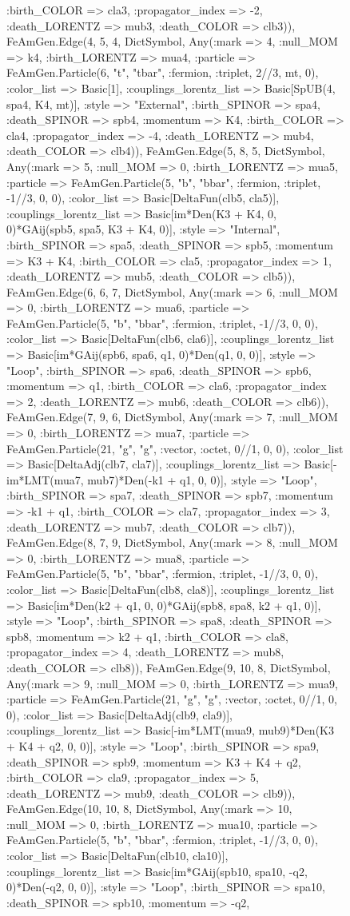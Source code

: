 \documentclass{revtex4}
\begin{document}
\begin{figure}[!htb]
\begin{center}
{:birth_COLOR => cla3, :propagator_index => -2, :death_LORENTZ => mub3, :death_COLOR => clb3)), FeAmGen.Edge(4, 5, 4, Dict{Symbol, Any}(:mark => 4, :null_MOM => k4, :birth_LORENTZ => mua4, :particle => FeAmGen.Particle(6, "t", "tbar", :fermion, :triplet, 2//3, mt, 0), :color_list => Basic[1], :couplings_lorentz_list => Basic[SpUB(4, spa4, K4, mt)], :style => "External", :birth_SPINOR => spa4, :death_SPINOR => spb4, :momentum => K4, :birth_COLOR => cla4, :propagator_index => -4, :death_LORENTZ => mub4, :death_COLOR => clb4)), FeAmGen.Edge(5, 8, 5, Dict{Symbol, Any}(:mark => 5, :null_MOM => 0, :birth_LORENTZ => mua5, :particle => FeAmGen.Particle(5, "b", "bbar", :fermion, :triplet, -1//3, 0, 0), :color_list => Basic[DeltaFun(clb5, cla5)], :couplings_lorentz_list => Basic[im*Den(K3 + K4, 0, 0)*GAij(spb5, spa5, K3 + K4, 0)], :style => "Internal", :birth_SPINOR => spa5, :death_SPINOR => spb5, :momentum => K3 + K4, :birth_COLOR => cla5, :propagator_index => 1, :death_LORENTZ => mub5, :death_COLOR => clb5)), FeAmGen.Edge(6, 6, 7, Dict{Symbol, Any}(:mark => 6, :null_MOM => 0, :birth_LORENTZ => mua6, :particle => FeAmGen.Particle(5, "b", "bbar", :fermion, :triplet, -1//3, 0, 0), :color_list => Basic[DeltaFun(clb6, cla6)], :couplings_lorentz_list => Basic[im*GAij(spb6, spa6, q1, 0)*Den(q1, 0, 0)], :style => "Loop", :birth_SPINOR => spa6, :death_SPINOR => spb6, :momentum => q1, :birth_COLOR => cla6, :propagator_index => 2, :death_LORENTZ => mub6, :death_COLOR => clb6)), FeAmGen.Edge(7, 9, 6, Dict{Symbol, Any}(:mark => 7, :null_MOM => 0, :birth_LORENTZ => mua7, :particle => FeAmGen.Particle(21, "g", "g", :vector, :octet, 0//1, 0, 0), :color_list => Basic[DeltaAdj(clb7, cla7)], :couplings_lorentz_list => Basic[-im*LMT(mua7, mub7)*Den(-k1 + q1, 0, 0)], :style => "Loop", :birth_SPINOR => spa7, :death_SPINOR => spb7, :momentum => -k1 + q1, :birth_COLOR => cla7, :propagator_index => 3, :death_LORENTZ => mub7, :death_COLOR => clb7)), FeAmGen.Edge(8, 7, 9, Dict{Symbol, Any}(:mark => 8, :null_MOM => 0, :birth_LORENTZ => mua8, :particle => FeAmGen.Particle(5, "b", "bbar", :fermion, :triplet, -1//3, 0, 0), :color_list => Basic[DeltaFun(clb8, cla8)], :couplings_lorentz_list => Basic[im*Den(k2 + q1, 0, 0)*GAij(spb8, spa8, k2 + q1, 0)], :style => "Loop", :birth_SPINOR => spa8, :death_SPINOR => spb8, :momentum => k2 + q1, :birth_COLOR => cla8, :propagator_index => 4, :death_LORENTZ => mub8, :death_COLOR => clb8)), FeAmGen.Edge(9, 10, 8, Dict{Symbol, Any}(:mark => 9, :null_MOM => 0, :birth_LORENTZ => mua9, :particle => FeAmGen.Particle(21, "g", "g", :vector, :octet, 0//1, 0, 0), :color_list => Basic[DeltaAdj(clb9, cla9)], :couplings_lorentz_list => Basic[-im*LMT(mua9, mub9)*Den(K3 + K4 + q2, 0, 0)], :style => "Loop", :birth_SPINOR => spa9, :death_SPINOR => spb9, :momentum => K3 + K4 + q2, :birth_COLOR => cla9, :propagator_index => 5, :death_LORENTZ => mub9, :death_COLOR => clb9)), FeAmGen.Edge(10, 10, 8, Dict{Symbol, Any}(:mark => 10, :null_MOM => 0, :birth_LORENTZ => mua10, :particle => FeAmGen.Particle(5, "b", "bbar", :fermion, :triplet, -1//3, 0, 0), :color_list => Basic[DeltaFun(clb10, cla10)], :couplings_lorentz_list => Basic[im*GAij(spb10, spa10, -q2, 0)*Den(-q2, 0, 0)], :style => "Loop", :birth_SPINOR => spa10, :death_SPINOR => spb10, :momentum => -q2, }
\end{center}
\end{figure}
\end{document}

